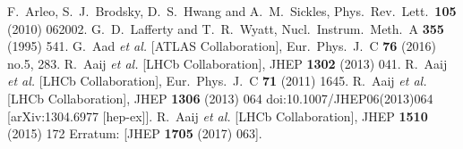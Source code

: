 \documentclass[a4paper,10pt]{article}
\begin{document}
 \begin{thebibliography}{9}
  F.~Arleo, S.~J.~Brodsky, D.~S.~Hwang and A.~M.~Sickles,
  Phys.\ Rev.\ Lett.\  {\bf 105} (2010) 062002.
    G.~D.~Lafferty and T.~R.~Wyatt,
  Nucl.\ Instrum.\ Meth.\ A {\bf 355} (1995) 541.
  G.~Aad {\it et al.} [ATLAS Collaboration],
  Eur.\ Phys.\ J.\ C {\bf 76} (2016) no.5,  283.
  R.~Aaij {\it et al.} [LHCb Collaboration],
  JHEP {\bf 1302} (2013) 041.
  R.~Aaij {\it et al.} [LHCb Collaboration],
  Eur.\ Phys.\ J.\ C {\bf 71} (2011) 1645.
  R.~Aaij {\it et al.} [LHCb Collaboration],
  JHEP {\bf 1306} (2013) 064
  doi:10.1007/JHEP06(2013)064
  [arXiv:1304.6977 [hep-ex]].
  R.~Aaij {\it et al.} [LHCb Collaboration],
  JHEP {\bf 1510} (2015) 172
   Erratum: [JHEP {\bf 1705} (2017) 063].

\end{thebibliography}
\end{document}
